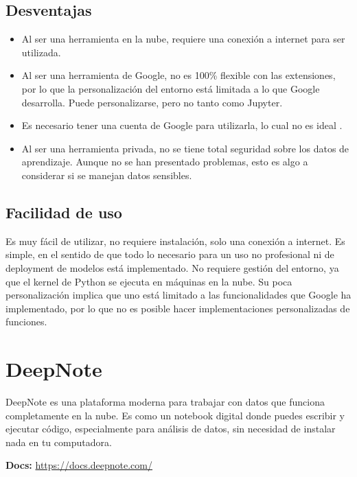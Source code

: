 \documentclass[a4paper,12pt]{article}
\begin{document}
\subsection{Desventajas}
\begin{itemize}
    \item Al ser una herramienta en la nube, requiere una conexión a internet para ser utilizada.
    \item Al ser una herramienta de Google, no es 100\% flexible con las extensiones, por lo que la personalización del entorno está limitada a lo que Google desarrolla. Puede personalizarse, pero no tanto como Jupyter.
    \item Es necesario tener una cuenta de Google para utilizarla, lo cual no es ideal \cite{google_colab_docs}.
    \item Al ser una herramienta privada, no se tiene total seguridad sobre los datos de aprendizaje. Aunque no se han presentado problemas, esto es algo a considerar si se manejan datos sensibles.
\end{itemize}

\subsection{Facilidad de uso}
Es muy fácil de utilizar, no requiere instalación, solo una conexión a internet. Es simple, en el sentido de que todo lo necesario para un uso no profesional ni de deployment de modelos está implementado. No requiere gestión del entorno, ya que el kernel de Python se ejecuta en máquinas en la nube.
Su poca personalización implica que uno está limitado a las funcionalidades que Google ha implementado, por lo que no es posible hacer implementaciones personalizadas de funciones.

\section{DeepNote}
DeepNote es una plataforma moderna para trabajar con datos que funciona completamente en la nube. Es como un notebook digital donde puedes escribir y ejecutar código, especialmente para análisis de datos, sin necesidad de instalar nada en tu computadora.\cite{deepnote_docs}

\textbf{Docs:} \url{https://docs.deepnote.com/}\cite{deepnote_docs}
\end{document}
